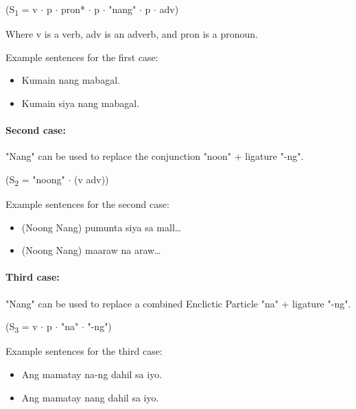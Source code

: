 \begin{center}
      (S\textsubscript{1} = v \(\cdot\) p \(\cdot\) pron* \(\cdot\) p \(\cdot\)
      "nang" \(\cdot\) p \(\cdot\) adv)
\end{center}

Where v is a verb, adv is an adverb, and pron is a pronoun.

\begin{example}
      Example sentences for the first case:
\end{example}
\begin{itemize}
      \item Kumain nang mabagal.
      \item             Kumain siya nang mabagal.

\end{itemize}

\paragraph{Second case:} "Nang" can be used to replace the conjunction "noon" +
ligature "-ng".

\begin{center}
      (S\textsubscript{2} = "noong" \(\cdot\) (v {\textpipe} adv))
\end{center}

\begin{example}
      Example sentences for the second case:
\end{example}

\begin{itemize}
      \item (Noong {\textpipe} Nang) pumunta siya sa mall…
      \item (Noong {\textpipe} Nang) maaraw na araw…
\end{itemize}

\paragraph{Third case:} "Nang" can be used to replace a combined Enclictic Particle
"na" + ligature "-ng".

\begin{center}
      (S\textsubscript{3} = v \(\cdot\) p \(\cdot\) "na" \(\cdot\) "-ng")
\end{center}

\begin{example}
      Example sentences for the third case:
\end{example}
\begin{itemize}
      \item Ang mamatay na-ng dahil sa iyo.
      \item Ang mamatay nang dahil sa iyo.
\end{itemize}

